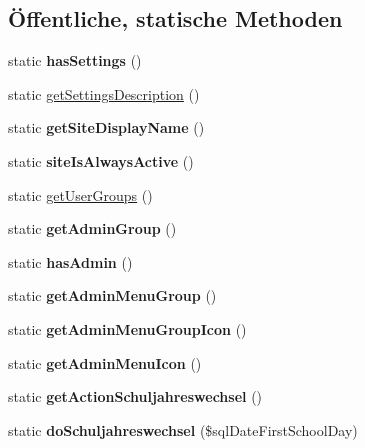 \subsection*{Öffentliche, statische Methoden}
\begin{DoxyCompactItemize}
\item 
\mbox{\label{classgeticsfeed_a039461ce058bb5f3d0ce7c19a6b10192}} 
static {\bfseries has\+Settings} ()
\item 
static \mbox{\hyperlink{classgeticsfeed_a7b8828c3e8b9774c242118d5c807e837}{get\+Settings\+Description}} ()
\item 
\mbox{\label{classgeticsfeed_a6df2ed9af990dbcb34c7b3b9fe734a6a}} 
static {\bfseries get\+Site\+Display\+Name} ()
\item 
\mbox{\label{classgeticsfeed_a8003509e3bc60111fe307d6457a3b508}} 
static {\bfseries site\+Is\+Always\+Active} ()
\item 
static \mbox{\hyperlink{classgeticsfeed_a15c3e1cbcdf7ad3ab4120690be5f587a}{get\+User\+Groups}} ()
\item 
\mbox{\label{classgeticsfeed_abcd5694b5c5ac1736fa521b3eb556b79}} 
static {\bfseries get\+Admin\+Group} ()
\item 
\mbox{\label{classgeticsfeed_af75fe60f6c2be992642a4c9939721a35}} 
static {\bfseries has\+Admin} ()
\item 
\mbox{\label{classgeticsfeed_a9368fa4b9b7b0d192b8992e4343bd326}} 
static {\bfseries get\+Admin\+Menu\+Group} ()
\item 
\mbox{\label{classgeticsfeed_a77a7b804f5f64d78623ca92bd6dc416a}} 
static {\bfseries get\+Admin\+Menu\+Group\+Icon} ()
\item 
\mbox{\label{classgeticsfeed_adb7de40b5ae4aa60ad8cc10f5b8814cf}} 
static {\bfseries get\+Admin\+Menu\+Icon} ()
\item 
\mbox{\label{classgeticsfeed_ab5af7eee7d8d7c0d3dcf7f79970ac0f9}} 
static {\bfseries get\+Action\+Schuljahreswechsel} ()
\item 
\mbox{\label{classgeticsfeed_a5a851baab845870fe213ae2aa22d37de}} 
static {\bfseries do\+Schuljahreswechsel} (\$sql\+Date\+First\+School\+Day)
\end{DoxyCompactItemize}
